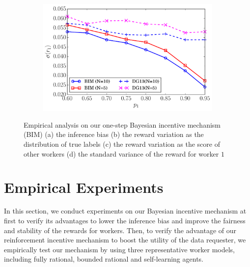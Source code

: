 \documentclass{article}
\begin{document}
\begin{figure}[t]
\begin{subfigure}[t]{0.24\textwidth}
        \caption{\label{BIM3}}
    \end{subfigure}
        ~
    \begin{subfigure}[t]{0.24\textwidth}
        \centering
        \includegraphics[width=\textwidth]{image/BPP3}
        \caption{\label{BIM4}}
    \end{subfigure}
    \vspace*{-3mm}
    \caption{\label{BIM}Empirical analysis on our one-step Bayesian incentive mechanism (BIM) (a) the inference bias (b) the reward variation as the distribution of true labels (c) the reward variation as the score of other workers (d) the standard variance of the reward for worker $1$}
\end{figure}

\section{Empirical Experiments}
In this section, we conduct experiments on our Bayesian incentive mechanism at first to verify its advantages to lower the inference bias and improve the fairness and stability of the rewards for workers.
Then, to verify the advantage of our reinforcement incentive mechanism to boost the utility of the data requester, we empirically test our mechanism by using three representative worker models, including fully rational, bounded rational and self-learning agents.
\end{document}
